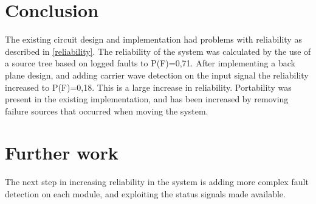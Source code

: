 \section{Conclusion}
The existing circuit design and implementation had problems with reliability as described in \cref{reliability}. The reliability of the system was calculated by the use of a source tree based on logged faults to P(F)=0,71. After implementing a back plane design, and adding carrier wave detection on the input signal the reliability increased to P(F)=0,18. This is a large increase in reliability. Portability was present in the existing implementation, and has been increased by removing failure sources that occurred when moving the system.

\section{Further work}
The next step in increasing reliability in the system is adding more complex fault detection on each module, and exploiting the status signals made available.